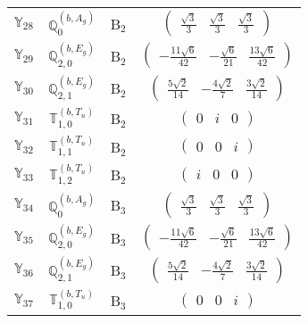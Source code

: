 \documentclass[fleqn,10pt,landscape]{article}
\begin{document}
\begin{itemize}
\begin{center}
\begin{longtable}{c|c|c|c}
$ \mathbb{Y}_{28} $ & $\mathbb{Q}_{0}^{(b,A_{g})}$ & B$_{2}$ & $\begin{pmatrix} \frac{\sqrt{3}}{3} & \frac{\sqrt{3}}{3} & \frac{\sqrt{3}}{3} \end{pmatrix}$ \\
$ \mathbb{Y}_{29} $ & $\mathbb{Q}_{2,0}^{(b,E_{g})}$ & B$_{2}$ & $\begin{pmatrix} - \frac{11 \sqrt{6}}{42} & - \frac{\sqrt{6}}{21} & \frac{13 \sqrt{6}}{42} \end{pmatrix}$ \\
$ \mathbb{Y}_{30} $ & $\mathbb{Q}_{2,1}^{(b,E_{g})}$ & B$_{2}$ & $\begin{pmatrix} \frac{5 \sqrt{2}}{14} & - \frac{4 \sqrt{2}}{7} & \frac{3 \sqrt{2}}{14} \end{pmatrix}$ \\
$ \mathbb{Y}_{31} $ & $\mathbb{T}_{1,0}^{(b,T_{u})}$ & B$_{2}$ & $\begin{pmatrix} 0 & i & 0 \end{pmatrix}$ \\
$ \mathbb{Y}_{32} $ & $\mathbb{T}_{1,1}^{(b,T_{u})}$ & B$_{2}$ & $\begin{pmatrix} 0 & 0 & i \end{pmatrix}$ \\
$ \mathbb{Y}_{33} $ & $\mathbb{T}_{1,2}^{(b,T_{u})}$ & B$_{2}$ & $\begin{pmatrix} i & 0 & 0 \end{pmatrix}$ \\ \hline
$ \mathbb{Y}_{34} $ & $\mathbb{Q}_{0}^{(b,A_{g})}$ & B$_{3}$ & $\begin{pmatrix} \frac{\sqrt{3}}{3} & \frac{\sqrt{3}}{3} & \frac{\sqrt{3}}{3} \end{pmatrix}$ \\
$ \mathbb{Y}_{35} $ & $\mathbb{Q}_{2,0}^{(b,E_{g})}$ & B$_{3}$ & $\begin{pmatrix} - \frac{11 \sqrt{6}}{42} & - \frac{\sqrt{6}}{21} & \frac{13 \sqrt{6}}{42} \end{pmatrix}$ \\
$ \mathbb{Y}_{36} $ & $\mathbb{Q}_{2,1}^{(b,E_{g})}$ & B$_{3}$ & $\begin{pmatrix} \frac{5 \sqrt{2}}{14} & - \frac{4 \sqrt{2}}{7} & \frac{3 \sqrt{2}}{14} \end{pmatrix}$ \\
$ \mathbb{Y}_{37} $ & $\mathbb{T}_{1,0}^{(b,T_{u})}$ & B$_{3}$ & $\begin{pmatrix} 0 & 0 & i \end{pmatrix}$ \\

\end{longtable}
\end{center}
\end{itemize}
\end{document}
